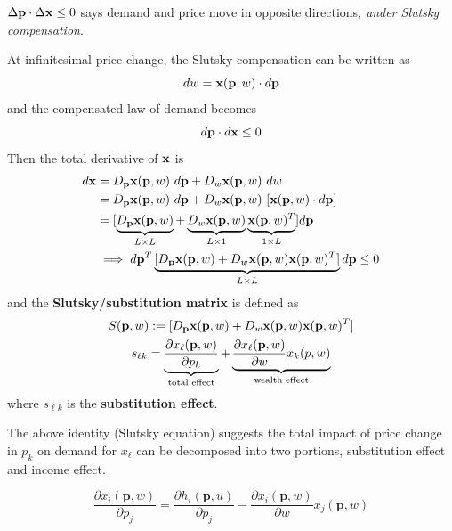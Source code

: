 \documentclass{article}
\begin{document}
 			\begin{corollary}
 				$\Delta \textbf{p} \cdot \Delta \textbf{x} \leq 0$ says demand and price move in opposite directions, \emph{under Slutsky compensation}.
 			\end{corollary}
 			
 			\begin{definition}
 				At infinitesimal price change, the Slutsky compensation can be written as 
 				\begin{equation}
 					dw = \textbf{x}(\textbf{p}, w) \cdot d\textbf{p}
 				\end{equation}
 				and the compensated law of demand becomes
 				\begin{equation}
 					d\textbf{p} \cdot d\textbf{x} \leq 0
 				\end{equation}
 				Then the total derivative of $\textbf{x}$ is 
 				\begin{align}
 					d\textbf{x} &= D_{\textbf{p}}\textbf{x}(\textbf{p}, w)\ d\textbf{p} + D_w \textbf{x}(\textbf{p}, w)\ dw \\
 					&= D_{\textbf{p}}\textbf{x}(\textbf{p}, w)\ d\textbf{p} + D_w \textbf{x} (\textbf{p}, w)\ [\textbf{x}(\textbf{p}, w) \cdot d\textbf{p}] \\
 					&= [\underbrace{D_{\textbf{p}}\textbf{x}(\textbf{p}, w)}_{L \times L} + \underbrace{D_w \textbf{x} (\textbf{p}, w)}_{L \times 1} \underbrace{\textbf{x}(\textbf{p}, w)^T}_{1 \times L}] d\textbf{p} \\
 					&\implies d\textbf{p}^T 
 					\underbrace{[D_{\textbf{p}}\textbf{x}(\textbf{p}, w) + D_w \textbf{x} (\textbf{p}, w) \textbf{x}(\textbf{p}, w)^T]}_{L \times L} d\textbf{p} \leq 0
 				\end{align}
 				and the \textbf{Slutsky/substitution matrix} is defined as
 				\begin{gather}
 					S(\textbf{p}, w) := [D_{\textbf{p}}\textbf{x}(\textbf{p}, w) + D_w \textbf{x} (\textbf{p}, w) \textbf{x}(\textbf{p}, w)^T] \\
 					s_{\ell k} = \underbrace{\frac{\partial{x_\ell(\textbf{p}, w)}}{\partial{p_k}}}_{\text{{total effect}}} + \underbrace{\frac{\partial{x_\ell(\textbf{p}, w)}}{\partial{w}} x_k (p, w)}_{\text{{wealth effect}}}
 				\end{gather}
 				where $s_{\ell k}$ is the \textbf{substitution effect}.
 			\end{definition}
 			
 			\begin{remark}
 				The above identity (Slutsky equation) suggests the total impact of price change in $p_k$ on demand for $x_{\ell}$ can be decomposed into two portions, substitution effect and income effect.
 			\end{remark}
 			
  			\begin{corollary}
 				\begin{equation}
 					\frac{\partial x_{i}(\mathbf{p}, w)}{\partial p_{j}}=\frac{\partial h_{i}(\mathbf{p}, u)}{\partial p_{j}}-\frac{\partial x_{i}(\mathbf{p}, w)}{\partial w} x_{j}(\mathbf{p}, w)
 				\end{equation}
 			\end{corollary}
 			
\end{document}
